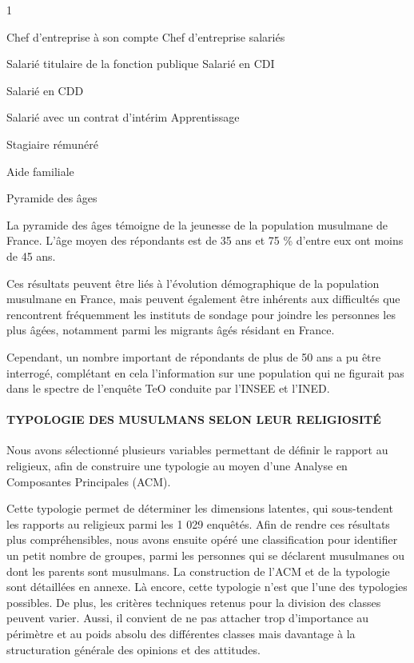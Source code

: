 1


Chef d'entreprise à son compte Chef d'entreprise salariés

Salarié titulaire de la fonction publique Salarié en CDI

Salarié en CDD

Salarié avec un contrat d'intérim Apprentissage

Stagiaire rémunéré

Aide familiale


Pyramide des âges


La pyramide des âges témoigne de la jeunesse de la population musulmane
de France. L'âge moyen des répondants est de 35 ans et 75 \% d'entre eux
ont moins de 45 ans.

Ces résultats peuvent être liés à l'évolution démographique de la
population musulmane en France, mais peuvent également être inhérents
aux difficultés que rencontrent fréquemment les instituts de sondage
pour joindre les personnes les plus âgées, notamment parmi les migrants
âgés résidant en France.

Cependant, un nombre important de répondants de plus de 50 ans a pu être
interrogé, complétant en cela l'information sur une population qui ne
figurait pas dans le spectre de l'enquête TeO conduite par l'INSEE et
l'INED.




\hypertarget{typologie-des-musulmans-selon-leur-religiosituxe9}{%
\paragraph{TYPOLOGIE DES MUSULMANS SELON LEUR
RELIGIOSITÉ}\label{typologie-des-musulmans-selon-leur-religiosituxe9}}


Nous avons sélectionné plusieurs variables permettant de définir le
rapport au religieux, afin de construire une typologie au moyen d'une
Analyse en Composantes Principales (ACM).

Cette typologie permet de déterminer les dimensions latentes, qui
sous-tendent les rapports au religieux parmi les 1 029 enquêtés. Afin de
rendre ces résultats plus compréhensibles, nous avons ensuite opéré une
classification pour identifier un petit nombre de groupes, parmi les
personnes qui se déclarent musulmanes ou dont les parents sont
musulmans. La construction de l'ACM et de la typologie sont détaillées
en annexe. Là encore, cette typologie n'est que l'une des typologies
possibles. De plus, les critères techniques retenus pour la division des
classes peuvent varier. Aussi, il convient de ne pas attacher trop
d'importance au périmètre et au poids absolu des différentes classes
mais davantage à la structuration générale des opinions et des
attitudes.


